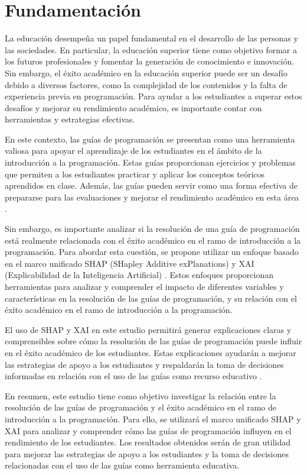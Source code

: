 \hypertarget{Fundamentación}{%
    \section{Fundamentación}\label{Fundamentación}}
La educación desempeña un papel fundamental en el desarrollo de las personas y las sociedades. En particular, la educación superior tiene como objetivo formar a los futuros profesionales y fomentar la generación de conocimiento e innovación. Sin embargo, el éxito académico en la educación superior puede ser un desafío debido a diversos factores, como la complejidad de los contenidos y la falta de experiencia previa en programación. Para ayudar a los estudiantes a superar estos desafíos y mejorar su rendimiento académico, es importante contar con herramientas y estrategias efectivas.

En este contexto, las guías de programación se presentan como una herramienta valiosa para apoyar el aprendizaje de los estudiantes en el ámbito de la introducción a la programación. Estas guías proporcionan ejercicios y problemas que permiten a los estudiantes practicar y aplicar los conceptos teóricos aprendidos en clase. Además, las guías pueden servir como una forma efectiva de prepararse para las evaluaciones y mejorar el rendimiento académico en esta área \cite{han2011data, garcia2018prediccion}.

Sin embargo, es importante analizar si la resolución de una guía de programación está realmente relacionada con el éxito académico en el ramo de introducción a la programación. Para abordar esta cuestión, se propone utilizar un enfoque basado en el marco unificado SHAP (SHapley Additive exPlanations) y XAI (Explicabilidad de la Inteligencia Artificial) \cite{lundberg2017unified, ribeiro2016trust, doshivelez2017rigorous}. Estos enfoques proporcionan herramientas para analizar y comprender el impacto de diferentes variables y características en la resolución de las guías de programación, y su relación con el éxito académico en el ramo de introducción a la programación.

El uso de SHAP y XAI en este estudio permitirá generar explicaciones claras y comprensibles sobre cómo la resolución de las guías de programación puede influir en el éxito académico de los estudiantes. Estas explicaciones ayudarán a mejorar las estrategias de apoyo a los estudiantes y respaldarán la toma de decisiones informadas en relación con el uso de las guías como recurso educativo \cite{lipton2018mythos}.

En resumen, este estudio tiene como objetivo investigar la relación entre la resolución de las guías de programación y el éxito académico en el ramo de introducción a la programación. Para ello, se utilizará el marco unificado SHAP y XAI para analizar y comprender cómo las guías de programación influyen en el rendimiento de los estudiantes. Los resultados obtenidos serán de gran utilidad para mejorar las estrategias de apoyo a los estudiantes y la toma de decisiones relacionadas con el uso de las guías como herramienta educativa.
